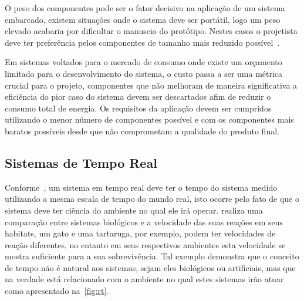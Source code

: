 O peso dos componentes pode ser o fator decisivo na aplicação de um sistema embarcado, existem situações onde o sistema deve ser portátil, logo um peso elevado acabaria por dificultar o manuseio do protótipo. Nestes casos o projetista deve ter preferência pelos componentes de tamanho mais reduzido possível~\cite{marwedel:2011}.

Em sistemas voltados para o mercado de consumo onde existe um orçamento limitado para o desenvolvimento do sistema, o custo passa a ser uma métrica crucial para o projeto, componentes que não melhoram de maneira significativa a eficiência do pior caso do sistema devem ser descartados afim de reduzir o consumo total de energia. Os requisitos da aplicação devem ser cumpridos utilizando o menor número de componentes possível e com os componentes mais baratos possíveis desde que não comprometam a qualidade do produto final. \cite{marwedel:2011}



\subsection{Sistemas de Tempo Real} %

Conforme~, um sistema em tempo real deve ter o tempo do sistema medido utilizando a mesma escala de tempo do mundo real, isto ocorre pelo fato de que o sistema deve ter ciência do ambiente no qual ele irá operar. 
% 
 realiza uma comparação entre sistemas biológicos e a velocidade das suas reações em seus habitats, um gato e uma tartaruga, por exemplo, podem ter velocidades de reação diferentes, no entanto em seus respectivos ambientes esta velocidade se mostra suficiente para a sua sobrevivência. 
Tal exemplo demonstra que o conceito de tempo não é natural aos sistemas, sejam eles biológicos ou artificiais, mas que na verdade está relacionado com o ambiente no qual estes sistemas irão atuar como apresentado na~\autoref{fig:rt}.

